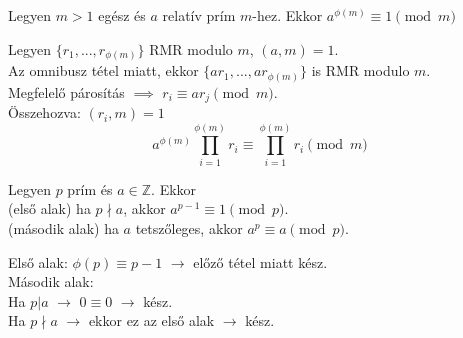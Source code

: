 \begin{frame}

\begin{tcolorbox}[title={Tétel: Euler-Fermat tétel}]
Legyen $m > 1$ egész és $a$ relatív prím $m$-hez. Ekkor $a^{{\phi}(m)} \equiv 1 \pmod{m}$
\end{tcolorbox}

\begin{tcolorbox}[title={Bizonyítás}]
Legyen $\{ r_1, ..., r_{{\phi}(m)}\}$ RMR modulo $m$, $(a, m) = 1$.\\
Az omnibusz tétel miatt, ekkor $\{ ar_1, ..., ar_{{\phi}(m)}\}$ is RMR modulo $m$.\\
Megfelelő párosítás $\implies$ $r_i \equiv ar_j \pmod{m}$.\\
Összehozva: $(r_i, m) = 1$\\
\smallskip
$$a^{{\phi}(m)} \prod^{{\phi}(m)}_{i=1} r_i \equiv \prod^{{\phi}(m)}_{i=1} r_i \pmod{m}$$

\end{tcolorbox}

\end{frame}

\begin{frame}

\begin{tcolorbox}[title={Tétel: (Kis) Fermat tétel}]
Legyen $p$ prím és $a \in \mathbb{Z}$. Ekkor\\
(első alak) ha $p \nmid a$, akkor $a^{p-1} \equiv 1 \pmod{p}$.\\
(második alak) ha $a$ tetszőleges, akkor $a^p \equiv a \pmod{p}$.

\end{tcolorbox}

\begin{tcolorbox}[title={Bizonyítás}]
Első alak: ${\phi}(p) \equiv p - 1$ $\rightarrow$ előző tétel miatt kész.\\
\bigskip
Második alak:\\
Ha $p|a$ $\rightarrow$ $0 \equiv 0$ $\rightarrow$ kész.\\
Ha $p{\nmid}a$ $\rightarrow$ ekkor ez az első alak $\rightarrow$ kész.

\end{tcolorbox}

\end{frame}

